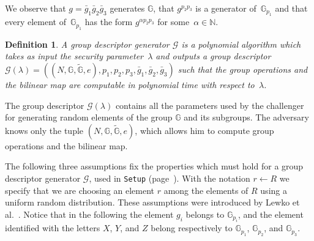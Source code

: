 \documentclass[a4paper,10pt]{article}
\newtheorem{definition}{Definition}
\newcommand{\G}{\mathbb{G}}
\newcommand{\GT}{\widetilde{\G}} \newcommand{\N}{\mathbb{N}}
\newcommand{\singlefunction}[1]{\texttt{#1}}
\begin{document}
		We observe that $g=\bar{g}_1 \bar{g}_2 \bar{g}_3$ generates $\G$, that $g^{p_2 p_3}$ is a generator of~$\G_{p_1}$ and that every element of~$\G_{p_1}$ has the form $g^{\alpha p_2 p_3}$ for some~$\alpha\in\N$.
		\begin{definition}
		\label{groupdesgen.def}
		A \emph{group descriptor generator} $\mathscr{G}$ is a polynomial algorithm which takes as input the security parameter~$\lambda$ and outputs a group descriptor \linebreak $\mathscr{G}(\lambda)=((N,\G,\GT,e),p_1,p_2,p_3,\bar{g}_1,\bar{g}_2,\bar{g}_3)$ such that 
	the group operations and the bilinear map  are computable in polynomial time with respect to~$\lambda$.
	\end{definition}
	


	The group descriptor $\mathscr{G}(\lambda)$ contains all the parameters used by the challenger for generating random elements of the group  $\G$ and its subgroups. The adversary knows only the tuple $(N,\G,\GT,e)$, which allows him to compute group operations and the bilinear map.
	
	The  following three assumptions fix the properties which must hold for a group descriptor generator $\mathscr{G}$, used in \singlefunction{Setup} (page~\pageref{RS-ABE_Setup-theory}).
	With the notation
	$
		r \leftarrow R
	$
	we specify that we are choosing an element $r$ among the elements of $R$ using a uniform random distribution. These assumptions were introduced by Lewko et al.~\cite{lewko2010assumptions}.
	Notice that in the following 
	the element $g_i$ belongs to $\G_{p_i}$, and 
	the element identified with the letters $X$, $Y$, and $Z$ belong respectively to $\G_{p_1}$, $\G_{p_2}$, and $\G_{p_3}$.
\end{document}
